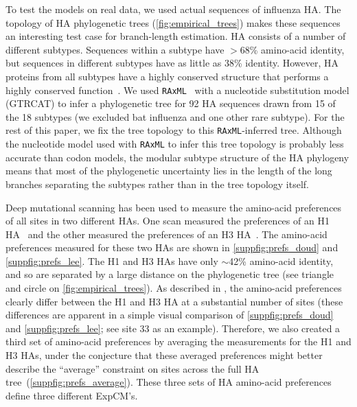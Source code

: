 \documentclass[11pt]{article}
\begin{document}
To test the models on real data, we used actual sequences of influenza HA. 
The topology of HA phylogenetic trees (\ref{fig:empirical_trees}) makes these sequences an interesting test case for branch-length estimation.
HA consists of a number of different subtypes.
Sequences within a subtype have $>$68\% amino-acid identity, but sequences in different subtypes have as little as 38\% identity.
However, HA proteins from all subtypes have a highly conserved structure that performs a highly conserved function~\citep{ha2002h5,russell2004h1}.
We used \texttt{RAxML}~\citep{stamatakis2006raxml} with a nucleotide substitution model  (GTRCAT) to infer a phylogenetic tree for 92 HA sequences drawn from 15 of the 18 subtypes (we excluded bat influenza and one other rare subtype).
For the rest of this paper, we fix the tree topology to this \texttt{RAxML}-inferred tree.
Although the nucleotide model used with \texttt{RAxML} to infer this tree topology is probably less accurate than codon models, the modular subtype structure of the HA phylogeny means that most of the phylogenetic uncertainty lies in the length of the long branches separating the subtypes rather than in the tree topology itself.

Deep mutational scanning has been used to measure the amino-acid preferences of all sites in two different HAs.
One scan measured the preferences of an H1 HA~\citep{doud2016accurate} and the other measured the preferences of an H3 HA~\citep{lee2018deep}.
The amino-acid preferences measured for these two HAs are shown in \ref{suppfig:prefs_doud} and 
\ref{suppfig:prefs_lee}.
The H1 and H3 HAs have only $\sim$42\% amino-acid identity, and so are separated by a large distance on the phylogenetic tree (see triangle and circle on \ref{fig:empirical_trees}).
As described in \citet{lee2018deep}, the amino-acid preferences clearly differ between the H1 and H3 HA at a substantial number of sites (these differences are apparent in a simple visual comparison of \ref{suppfig:prefs_doud} and 
\ref{suppfig:prefs_lee}; see site 33 as an example).
Therefore, we also created a third set of amino-acid preferences by averaging the measurements for the H1 and H3 HAs, under the conjecture that these averaged preferences might better describe the ``average'' constraint on sites across the full HA tree~(\ref{suppfig:prefs_average}).
These three sets of HA amino-acid preferences define three different ExpCM's.
  
\end{document}
